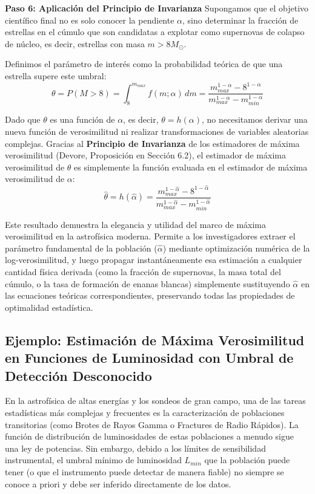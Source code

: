 \textbf{Paso 6: Aplicación del Principio de Invarianza}
Supongamos que el objetivo científico final no es solo conocer la pendiente $\alpha$, sino determinar la fracción de estrellas en el cúmulo que son candidatas a explotar como supernovas de colapso de núcleo, es decir, estrellas con masa $m > 8 M_\odot$. 

Definimos el parámetro de interés como la probabilidad teórica de que una estrella supere este umbral:
$$ \theta = P(M > 8) = \int_{8}^{m_{max}} f(m; \alpha) \, dm = \frac{m_{max}^{1-\alpha} - 8^{1-\alpha}}{m_{max}^{1-\alpha} - m_{min}^{1-\alpha}} $$

Dado que $\theta$ es una función de $\alpha$, es decir, $\theta = h(\alpha)$, no necesitamos derivar una nueva función de verosimilitud ni realizar transformaciones de variables aleatorias complejas. Gracias al \textbf{Principio de Invarianza} de los estimadores de máxima verosimilitud (Devore, Proposición en Sección 6.2), el estimador de máxima verosimilitud de $\theta$ es simplemente la función evaluada en el estimador de máxima verosimilitud de $\alpha$:
$$ \hat{\theta} = h(\hat{\alpha}) = \frac{m_{max}^{1-\hat{\alpha}} - 8^{1-\hat{\alpha}}}{m_{max}^{1-\hat{\alpha}} - m_{min}^{1-\hat{\alpha}}} $$

Este resultado demuestra la elegancia y utilidad del marco de máxima verosimilitud en la astrofísica moderna. Permite a los investigadores extraer el parámetro fundamental de la población ($\hat{\alpha}$) mediante optimización numérica de la log-verosimilitud, y luego propagar instantáneamente esa estimación a cualquier cantidad física derivada (como la fracción de supernovas, la masa total del cúmulo, o la tasa de formación de enanas blancas) simplemente sustituyendo $\hat{\alpha}$ en las ecuaciones teóricas correspondientes, preservando todas las propiedades de optimalidad estadística.


\subsection{Ejemplo: Estimación de Máxima Verosimilitud en Funciones de Luminosidad con Umbral de Detección Desconocido}

En la astrofísica de altas energías y los sondeos de gran campo, una de las tareas estadísticas más complejas y frecuentes es la caracterización de poblaciones transitorias (como Brotes de Rayos Gamma o Fractures de Radio Rápidos). La función de distribución de luminosidades de estas poblaciones a menudo sigue una ley de potencias. Sin embargo, debido a los límites de sensibilidad instrumental, el umbral mínimo de luminosidad $L_{min}$ que la población puede tener (o que el instrumento puede detectar de manera fiable) no siempre se conoce a priori y debe ser inferido directamente de los datos. 

